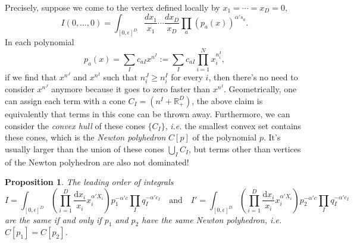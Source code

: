 \documentclass[12pt]{article}
\theoremstyle{definition}
\theoremstyle{plain}
\newtheorem{pro}[para]{Proposition}
\newcommand{\dif}{\mathrm{d}} %
\begin{document}
Precisely, suppose we come to the vertex defined locally by $x_1=\cdots=x_D=0$, 
\[
	I(0,\dots,0)=\int_{[0,\epsilon]^D} \frac{d x_1}{x_1}\cdots \frac{d x_D}{x_D} 
	\prod_a(p_a(x))^{\alpha' s_a}.
\]
In each polynomial 
\[
	p_a(x)=\sum_{I} c_{aI} x^{n^I}:=\sum_I c_{aI} \prod_{i=1}^N x_i^{n^I_i},
\]
if we find that $x^{n^J}$ and $x^{n^I}$ 
such that $n^J_i\geq n^I_i$ for every $i$, then there's no need to consider 
$x^{n^J}$ anymore because it goes to zero faster than $x^{n^I}$. 
Geometrically, one can assign each term with a cone 
$C_{I}=(n^I+\mathbb R^D_{+})$, the above
claim is equivalently that terms in this cone can be thrown away.
Furthermore, we can consider the \textit{convex hull} of these cones $\{C_I\}$, 
\textit{i.e.} the smallest convex set contains these cones,
which is the \textit{Newton polyhedron} $C[p]$ of the polynomial $p$. 
It's usually larger than the union of these cones $\bigcup_I C_I$, 
but terms other than vertices of the Newton polyhedron 
are also not dominated! 

\begin{pro}
The leading order of integrals
\[
	I=\int_{[0,\epsilon]^D} \left(\prod_{i=1}^D\frac{\dif x_i}{x_i}x_i^{\alpha' X_i}\right)
	p_1^{-\alpha' c} \prod_I q_I^{-\alpha' c_I}
	\quad \text{and} \quad 
	I'=\int_{[0,\epsilon]^D} \left(\prod_{i=1}^D\frac{\dif x_i}{x_i}x_i^{\alpha' X_i}\right)
	p_2^{-\alpha' c} \prod_I q_I^{-\alpha' c_I}
\]
are the same if and only if $p_1$ and $p_2$ have the same Newton polyhedron,
\textit{i.e.} $C[p_1]=C[p_2]$.
\end{pro}
\end{document}
